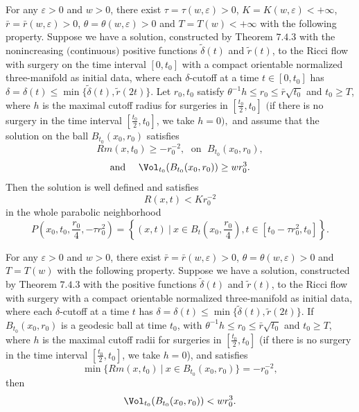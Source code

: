 \begin{theorem}
  \label{thm:cz-large-time-surgery-curvature-estimate}

For any $\varepsilon > 0$ and $w>0$, there exist
$\tau=\tau(w,\varepsilon)>0$, $K=K(w,\varepsilon)<+\infty$,
$\bar{r}=\bar{r}(w,\varepsilon)>0$,
$\theta=\theta(w,\varepsilon)>0$ and $T=T(w) < +\infty$ with the
following property. Suppose we have a solution, constructed by
Theorem $7.4.3$ with the nonincreasing $($continuous$)$ positive
functions $\widetilde{\delta}(t)$ and $\widetilde{r}(t)$, to the
Ricci flow with surgery on the time interval $[0,t_0]$ with a
compact orientable normalized three-manifold as initial data,
where each $\delta$-cutoff at a time $t \in [0,t_0]$ has
$\delta=\delta(t) \leq \min
\{\widetilde{\delta}(t),\widetilde{r}(2t)\}$. Let $r_0,t_0$
satisfy $\theta^{-1}h\leq r_0\leq \bar{r}\sqrt{t_0}$ and $t_0 \geq
T$, where $h$ is the maximal cutoff radius for surgeries in
$[\frac{t_0}{2},t_0]$ $($if there is no surgery in the time
interval $[\frac{t_0}{2},t_0]$, we take $h=0),$ and assume that
the solution on the ball $B_{t_0}(x_0,r_0)$ satisfies
$$
Rm(x,t_0) \geq -r^{-2}_0,\; \mbox{ on }\; B_{t_0}(x_0,r_0),
$$
$$
\mbox{and }\quad  \Vol_{t_0}(B_{t_0}(x_0,r_0)) \geq w r^3_0.
$$
Then the solution is well defined and satisfies
$$
R(x,t)<Kr^{-2}_0
$$
in the whole parabolic neighborhood
$$
P\left(x_0,t_0,\frac{r_0}{4},-\tau r^2_0\right) =\left\{(x,t)\ |\ x\in
B_t\left(x_0,\frac{r_0}{4}\right),t\in[t_0-\tau r^2_0,t_0]\right\}.
$$
\end{theorem}
\begin{corollary}
  \label{cor:cz-large-time-local-volume-canonical-neighborhoods}

For any $\varepsilon > 0$ and $w>0$, there exist
$\bar{r}=\bar{r}(w,\varepsilon)>0$,
$\theta=\theta(w,\varepsilon)>0$ and $T=T(w)$ with the following
property. Suppose we have a solution, constructed by Theorem
$7.4.3$ with the positive functions $\widetilde{\delta}(t)$ and
$\widetilde{r}(t)$, to the Ricci flow with surgery with a compact
orientable normalized three-manifold as initial data, where each
$\delta$-cutoff at a time $t$ has $\delta=\delta(t)\leq
\min\{\widetilde{\delta}(t), \widetilde{r}(2t)\}$. If
$B_{t_0}(x_0,r_0)$ is a geodesic ball at time $t_0$, with
$\theta^{-1}h\leq r_0\leq \bar{r}\sqrt{t_0}$ and $t_0 \geq T$,
where $h$ is the maximal cutoff radii for surgeries in
$[\frac{t_0}{2},t_0]$ (if there is no surgery in the time interval
$[\frac{t_0}{2},t_0]$, we take $h=0$), and satisfies
$$
\min\{Rm(x,t_0)\ |\ x\in B_{t_0}(x_0,r_0)\}=-r^{-2}_0,
$$
then
$$
\Vol_{t_0}(B_{t_0}(x_0,r_0))<w r^3_0.
$$
\end{corollary}
